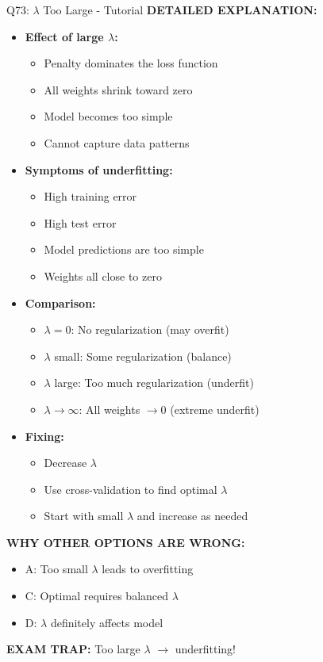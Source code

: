\documentclass[8pt]{beamer}
\begin{document}
\begin{frame}{Q73: $\lambda$ Too Large - Tutorial}
		\vspace{0.05cm}
		\textbf{DETAILED EXPLANATION:}
		\begin{itemize}
			\item \textbf{Effect of large $\lambda$:}
			\begin{itemize}
				\item Penalty dominates the loss function
				\item All weights shrink toward zero
				\item Model becomes too simple
				\item Cannot capture data patterns
			\end{itemize}
			\item \textbf{Symptoms of underfitting:}
			\begin{itemize}
				\item High training error
				\item High test error
				\item Model predictions are too simple
				\item Weights all close to zero
			\end{itemize}
			\item \textbf{Comparison:}
			\begin{itemize}
				\item $\lambda = 0$: No regularization (may overfit)
				\item $\lambda$ small: Some regularization (balance)
				\item $\lambda$ large: Too much regularization (underfit)
				\item $\lambda \to \infty$: All weights $\to 0$ (extreme underfit)
			\end{itemize}
			\item \textbf{Fixing:}
			\begin{itemize}
				\item Decrease $\lambda$
				\item Use cross-validation to find optimal $\lambda$
				\item Start with small $\lambda$ and increase as needed
			\end{itemize}
		\end{itemize}
		
		\vspace{0.05cm}
		\textcolor{myred}{\textbf{WHY OTHER OPTIONS ARE WRONG:}}
		\begin{itemize}
			\item \textcolor{myred}{A:} Too small $\lambda$ leads to overfitting
			\item \textcolor{myred}{C:} Optimal requires balanced $\lambda$
			\item \textcolor{myred}{D:} $\lambda$ definitely affects model
		\end{itemize}
		
		\textcolor{myred}{\textbf{EXAM TRAP:}} Too large $\lambda$ $\to$ underfitting!
	\end{frame}
	
\end{document}
